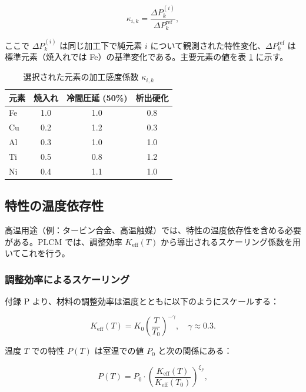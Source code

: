 \documentclass[11pt,a4paper]{article}
\newcommand{\Keff}{K_{\mathrm{eff}}}
\theoremstyle{remark}
\begin{document}
	\begin{equation}
		\kappa_{i,k} = \frac{\Delta P_k^{(i)}}{\Delta P_k^{\text{ref}}},
		\label{eq:kappa-proc-def}
	\end{equation}
	
	ここで \(\Delta P_k^{(i)}\) は同じ加工下で純元素 \(i\) について観測された特性変化、\(\Delta P_k^{\text{ref}}\) は標準元素（焼入れでは Fe）の基準変化である。主要元素の値を表 \ref{tab:kappa-proc} に示す。
	
	\begin{table}[htbp]
		\centering
		\caption{選択された元素の加工感度係数 \(\kappa_{i,k}\)}
		\label{tab:kappa-proc}
		\begin{tabular}{lccc}
			\toprule
			元素 & 焼入れ & 冷間圧延 (50\%) & 析出硬化 \\
			\midrule
			Fe & 1.0 & 1.0 & 0.8 \\
			Cu & 0.2 & 1.2 & 0.3 \\
			Al & 0.3 & 1.0 & 1.0 \\
			Ti & 0.5 & 0.8 & 1.2 \\
			Ni & 0.4 & 1.1 & 1.0 \\
			\bottomrule
		\end{tabular}
	\end{table}
	
	\subsection{特性の温度依存性}
	\label{subsec:temperature-dependence}
	
	高温用途（例：タービン合金、高温触媒）では、特性の温度依存性を含める必要がある。PLCM では、調整効率 \(\Keff(T)\) から導出されるスケーリング係数を用いてこれを行う。
	
	\subsubsection{調整効率によるスケーリング}
	付録 P より、材料の調整効率は温度とともに以下のようにスケールする：
	
	\begin{equation}
		\Keff(T) = K_0 \left( \frac{T}{T_0} \right)^{-\gamma}, \quad \gamma \approx 0.3.
		\label{eq:keff-T}
	\end{equation}
	
	温度 \(T\) での特性 \(P(T)\) は室温での値 \(P_0\) と次の関係にある：
	
	\begin{equation}
		P(T) = P_0 \cdot \left( \frac{\Keff(T)}{\Keff(T_0)} \right)^{\xi_P},
		\label{eq:property-T-scaling}
	\end{equation}
	
\end{document}
